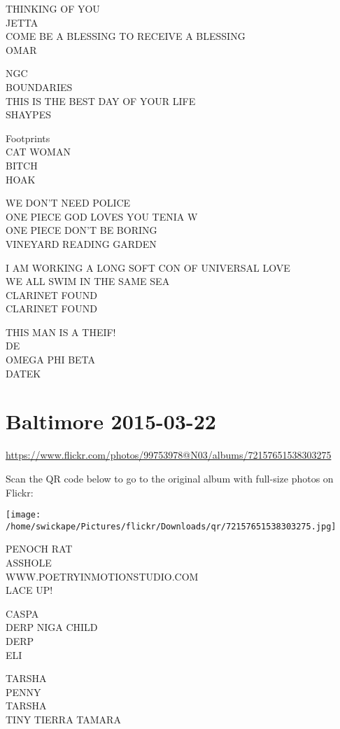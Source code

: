\documentclass[10pt,letterpaper]{article}
\begin{document}
THINKING OF YOU\\
JETTA\\
COME BE A BLESSING TO RECEIVE A BLESSING\\
OMAR

NGC\\
BOUNDARIES\\
THIS IS THE BEST DAY OF YOUR LIFE\\
SHAYPES

Footprints\\
CAT WOMAN\\
BITCH\\
HOAK

WE DON'T NEED POLICE\\
ONE PIECE GOD LOVES YOU TENIA W\\
ONE PIECE DON'T BE BORING\\
VINEYARD READING GARDEN

I AM WORKING A LONG SOFT CON OF UNIVERSAL LOVE\\
WE ALL SWIM IN THE SAME SEA\\
CLARINET FOUND\\
CLARINET FOUND

THIS MAN IS A THEIF!\\
DE\\
OMEGA PHI BETA\\
DATEK


\section*{Baltimore 2015-03-22}

\url{https://www.flickr.com/photos/99753978@N03/albums/72157651538303275}

Scan the QR code below to go to the original album with full-size photos on Flickr:

\texttt{[image: /home/swickape/Pictures/flickr/Downloads/qr/72157651538303275.jpg]}


PENOCH RAT\\
ASSHOLE\\
WWW.POETRYINMOTIONSTUDIO.COM\\
LACE UP!

CASPA\\
DERP NIGA CHILD\\
DERP\\
ELI

TARSHA\\
PENNY\\
TARSHA\\
TINY TIERRA TAMARA
\end{document}
